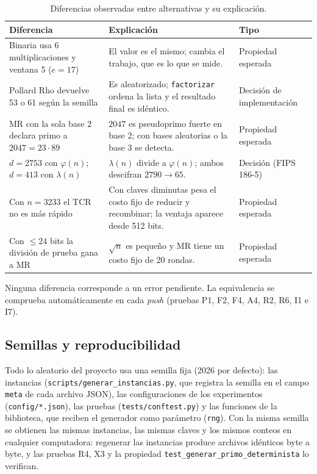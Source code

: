 \begin{table}[H]
\centering\small
\caption{Diferencias observadas entre alternativas y su explicación.}
\label{tab:diferencias}
\renewcommand{\arraystretch}{1.2}
\begin{tabularx}{\linewidth}{@{}R{4.3cm} Y R{2.6cm}@{}}
\toprule
\textbf{Diferencia} & \textbf{Explicación} & \textbf{Tipo}\\
\midrule
Binaria usa 6 multiplicaciones y ventana 5 ($e=17$) & El valor es el mismo; cambia el trabajo, que es lo que se mide. & Propiedad esperada\\
Pollard Rho devuelve 53 o 61 según la semilla & Es aleatorizado; \texttt{factorizar} ordena la lista y el resultado final es idéntico. & Decisión de implementación\\
MR con la sola base 2 declara primo a $2047=23\cdot89$ & $2047$ es pseudoprimo fuerte en base 2; con bases aleatorias o la base 3 se detecta. & Propiedad esperada\\
$d=2753$ con $\varphi(n)$; $d=413$ con $\lambda(n)$ & $\lambda(n)$ divide a $\varphi(n)$; ambos descifran $2790\rightarrow65$. & Decisión (FIPS 186-5)\\
Con $n=3233$ el TCR no es más rápido & Con claves diminutas pesa el costo fijo de reducir y recombinar; la ventaja aparece desde 512 bits. & Propiedad esperada\\
Con $\le24$ bits la división de prueba gana a MR & $\sqrt n$ es pequeño y MR tiene un costo fijo de 20 rondas. & Propiedad esperada\\
\bottomrule
\end{tabularx}
\end{table}

Ninguna diferencia corresponde a un error pendiente. La equivalencia se comprueba
automáticamente en cada \emph{push} (pruebas P1, F2, F4, A4, R2, R6, I1 e I7).

\subsection{Semillas y reproducibilidad}

Todo lo aleatorio del proyecto usa una semilla fija (2026 por defecto): las
instancias (\texttt{scripts/\allowbreak generar\_instancias.py}, que registra la semilla en
el campo \texttt{meta} de cada archivo JSON), las configuraciones de los
experimentos (\texttt{config/*.json}), las pruebas (\texttt{tests/conftest.py}) y
las funciones de la biblioteca, que reciben el generador como parámetro
(\texttt{rng}). Con la misma semilla se obtienen las mismas instancias, las
mismas claves y los mismos conteos en cualquier computadora: regenerar las
instancias produce archivos idénticos byte a byte, y las pruebas R4, X3 y la
propiedad \texttt{test\_generar\_\allowbreak primo\_\allowbreak determinista} lo verifican.

